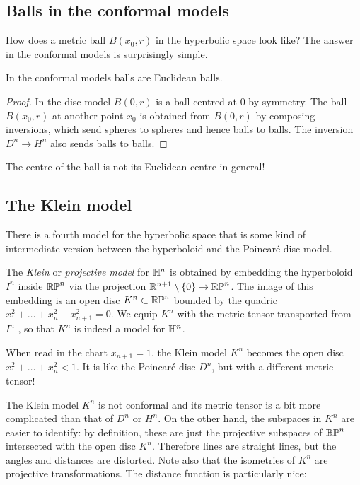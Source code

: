 \subsection{Balls in the conformal models}
How does a metric ball $B(x_0,r)$ in the hyperbolic space look like? The answer in the conformal models is surprisingly  simple. 

\begin{prop} \label{sfere:prop}
In the conformal models balls are Euclidean balls.
\end{prop}
\begin{proof}
In the disc model $B(0,r)$ is a ball centred at $0$ by symmetry. The ball $B(x_0,r)$ at another point $x_0$ is obtained from $B(0,r)$ by composing inversions, which send spheres to spheres and hence balls to balls. The inversion $D^n \to H^n$ also sends balls to balls. 
\end{proof}

The centre of the ball is not its Euclidean centre in general!

\subsection{The Klein model} \label{Klein;subsection}
There is a fourth model for the hyperbolic space that is some kind of intermediate version between the hyperboloid and the Poincar\'e disc model.

The \emph{Klein} or \emph{projective model} for $\mathbb{H}^n$ is obtained by embedding the hyperboloid $I^n$ inside $\mathbb{RP}^n$ via the projection $\mathbb{R}^{n+1}\setminus \{0\} \to \mathbb{RP}^n$. The image of this embedding is an open disc $K^n\subset \mathbb{RP}^n$ bounded by the quadric $x_1^2+\ldots +x_n^2-x_{n+1}^2 = 0$. We equip $K^n$ with the metric tensor transported from $I^n$ , so that $K^n$ is indeed a model for $\mathbb{H}^n$. 

When read in the chart $x_{n+1} = 1$, the Klein model $K^n$ becomes the open disc $x_1^2 + \ldots + x_n^2 < 1$. It is like the Poincar\'e disc $D^n$, but with a different metric tensor! 

The Klein model $K^n$ is not conformal and its metric tensor is a bit more complicated than that of $D^n$ or $H^n$. On the other hand, the subspaces in $K^n$ are easier to identify: by definition, these are just the projective subspaces of $\mathbb{RP}^n$ intersected with the open disc $K^n$. Therefore lines are straight lines, but the angles and distances are distorted. Note also that the isometries of $K^n$ are projective transformations. The distance function is particularly nice:


